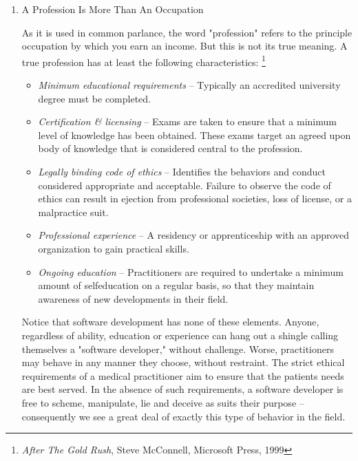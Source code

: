 \documentclass{article}
\begin{document}
\begin{enumerate}
\item A Profession Is More Than An Occupation
\label{sec:orgheadline405}

As it is used in common parlance, the word "profession" refers to the
principle occupation by which you earn an income. But this is not its
true meaning. A true profession has at least the following
characteristics: \footnote{\emph{After The Gold Rush}, Steve McConnell, Microsoft Press, 1999}

\begin{itemize}
\item \emph{Minimum educational requirements} -- Typically an accredited
university degree must be completed.\\
\item \emph{Certification \& licensing} -- Exams are taken to ensure that a
minimum level of knowledge has been obtained. These exams target an
agreed upon body of knowledge that is considered central to the
profession.\\
\item \emph{Legally binding code of ethics} -- Identifies the behaviors and
conduct considered appropriate and acceptable. Failure to observe the
code of ethics can result in ejection from professional societies,
loss of license, or a malpractice suit.\\
\item \emph{Professional experience} -- A residency or apprenticeship with an
approved organization to gain practical skills.\\
\item \emph{Ongoing education} -- Practitioners are required to undertake a
minimum amount of selfeducation on a regular basis, so that they
maintain awareness of new developments in their field.
\end{itemize}

Notice that software development has none of these elements. Anyone,
regardless of ability, education or experience can hang out a shingle
calling themselves a "software developer," without challenge. Worse,
practitioners may behave in any manner they choose, without restraint.
The strict ethical requirements of a medical practitioner aim to ensure
that the patients needs are best served. In the absence of such
requirements, a software developer is free to scheme, manipulate, lie
and deceive as suits their purpose -- consequently we see a great deal
of exactly this type of behavior in the field.


\end{enumerate}
\end{document}

